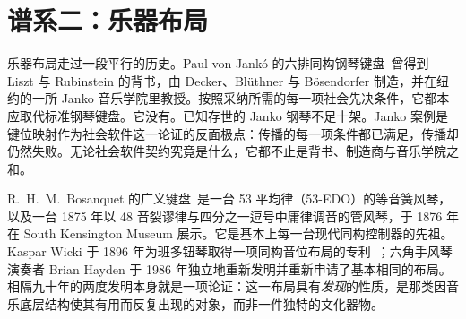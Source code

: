 \documentclass[10pt,letterpaper,twocolumn]{article}
\begin{document}
\section{谱系二：乐器布局}
\label{sec:lineage2}

乐器布局走过一段平行的历史。Paul von Jankó 的六排同构钢琴键盘~\citep{janko1882}曾得到 Liszt 与 Rubinstein 的背书，由 Decker、Blüthner 与 Bösendorfer 制造，并在纽约的一所 Janko 音乐学院里教授。按照采纳所需的每一项社会先决条件，它都本应取代标准钢琴键盘。它没有。已知存世的 Janko 钢琴不足十架。Janko 案例是键位映射作为社会软件这一论证的反面极点：传播的每一项条件都已满足，传播却仍然失败。无论社会软件契约究竟是什么，它都不止是背书、制造商与音乐学院之和。

R.\ H.\ M.\ Bosanquet 的广义键盘~\citep{bosanquet1875generalized}是一台 53 平均律（53-EDO）的等音簧风琴，以及一台 1875 年以 48 音裂谬律与四分之一逗号中庸律调音的管风琴，于 1876 年在 South Kensington Museum 展示。它是基本上每一台现代同构控制器的先祖。Kaspar Wicki 于 1896 年为班多钮琴取得一项同构音位布局的专利~\citep{wicki1896}；六角手风琴演奏者 Brian Hayden 于 1986 年独立地重新发明并重新申请了基本相同的布局。相隔九十年的两度发明本身就是一项论证：这一布局具有\emph{发现}的性质，是那类因音乐底层结构使其有用而反复出现的对象，而非一件独特的文化器物。
\end{document}
